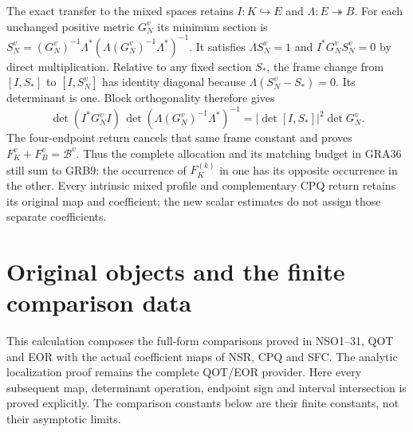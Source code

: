 \documentclass[11pt,a4paper]{article}
\begin{document}
The exact transfer to the mixed spaces retains $I:K\hookrightarrow E$
and $\Lambda:E\twoheadrightarrow B$.  For each unchanged positive metric
$G_N^v$ its minimum section is
$S_N^v=(G_N^v)^{-1}\Lambda^*(\Lambda(G_N^v)^{-1}\Lambda^*)^{-1}$.
It satisfies $\Lambda S_N^v=1$ and $I^*G_N^vS_N^v=0$ by direct
multiplication.  Relative to any fixed section $S_*$, the frame change
from $[I,S_*]$ to $[I,S_N^v]$ has identity diagonal because
$\Lambda(S_N^v-S_*)=0$.  Its determinant is one.  Block orthogonality
therefore gives
\[
 \det(I^*G_N^vI)\,
 \det(\Lambda(G_N^v)^{-1}\Lambda^*)^{-1}
 =|\det[I,S_*]|^2\det G_N^v.
\]
The four-endpoint return cancels that same frame constant and proves
$F_K^v+F_B^v=\mathcal B^v$.  Thus the complete allocation and its matching
budget in GRA36 still sum to GRB9: the occurrence of $F_K^{(k)}$ in one
has its opposite occurrence in the other.  Every intrinsic mixed profile
and complementary CPQ return retains its original map and coefficient;
the new scalar estimates do not assign those separate coefficients.

\label{GRBUILD:GRB_SHIFTED_ACTION:end}




\endgroup


\clearpage
\clearpage
\begingroup
\providecommand{\im}{\operatorname{im}}
\providecommand{\rank}{\operatorname{rank}}
\providecommand{\arsinh}{\operatorname{arsinh}}
\section{Original objects and the finite comparison data}
This calculation composes the full-form comparisons proved in NSO1--31,
QOT and EOR with the actual coefficient maps of NSR, CPQ and SFC.
The analytic localization proof remains the complete QOT/EOR provider.
Here every subsequent map, determinant operation, endpoint sign and
interval intersection is proved explicitly. The comparison constants below
are their finite constants, not their asymptotic limits.
\end{document}
